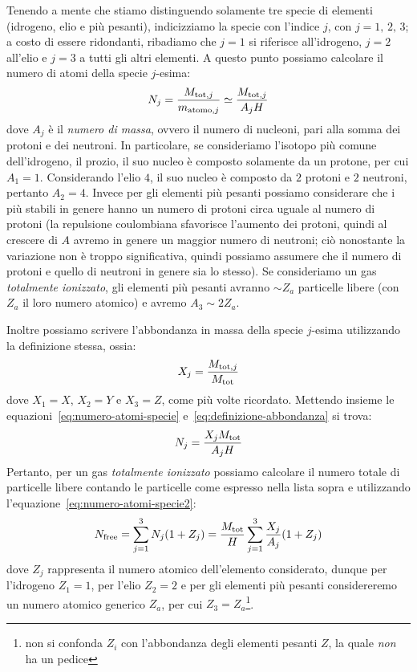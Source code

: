 Tenendo a mente che stiamo distinguendo solamente tre specie di elementi (idrogeno, elio e più pesanti), indicizziamo la specie con l'indice $j$, con $j = 1, \, 2, \, 3$; a costo di essere ridondanti, ribadiamo che $j=1$ si riferisce all'idrogeno, $j=2$ all'elio e $j=3$ a tutti gli altri elementi. A questo punto possiamo calcolare il numero di atomi della specie $j$-esima:
\begin{equation}\label{eq:numero-atomi-specie}
    N_j = \frac{M_{\textup{tot}, j}}{m_{\textup{atomo}, j}} \simeq \frac{M_{\textup{tot}, j}}{A_j H}
\end{equation}
dove $A_j$ è il \emph{numero di massa}, ovvero il numero di nucleoni, pari alla somma dei protoni e dei neutroni. In particolare, se consideriamo l'isotopo più comune dell'idrogeno, il prozio, il suo nucleo è composto solamente da un protone, per cui $A_1 = 1$. Considerando l'elio $4$, il suo nucleo è composto da $2$ protoni e $2$ neutroni, pertanto $A_2 = 4$. Invece per gli elementi più pesanti possiamo considerare che i più stabili in genere hanno un numero di protoni circa uguale al numero di protoni (la repulsione coulombiana sfavorisce l'aumento dei protoni, quindi al crescere di $A$ avremo in genere un maggior numero di neutroni; ciò nonostante la variazione non è troppo significativa, quindi possiamo assumere che il numero di protoni e quello di neutroni in genere sia lo stesso). Se consideriamo un gas \emph{totalmente ionizzato}, gli elementi più pesanti avranno $\sim Z_a$ particelle libere (con $Z_a$ il loro numero atomico) e avremo $A_3 \sim 2 Z_a$.

Inoltre possiamo scrivere l'abbondanza in massa della specie $j$-esima utilizzando la definizione stessa, ossia: 
\begin{equation}\label{eq:definizione-abbondanza}
    X_j = \frac{M_{\textup{tot}, j}}{M_\textup{tot}}
\end{equation}
dove $X_1 = X$, $X_2 = Y$ e $X_3 = Z$, come più volte ricordato. Mettendo insieme le equazioni~\eqref{eq:numero-atomi-specie} e~\eqref{eq:definizione-abbondanza} si trova:
\begin{equation}\label{eq:numero-atomi-specie2}
    N_j =\frac{X_j M_\textup{tot}}{A_j H}
\end{equation}
Pertanto, per un gas \emph{totalmente ionizzato} possiamo calcolare il numero totale di particelle libere contando le particelle come espresso nella lista sopra e utilizzando l'equazione~\eqref{eq:numero-atomi-specie2}:
\begin{equation}\label{eq:numero-atomi-liberi}
    N_\textup{free} = \sum_{j=1}^3 N_j (1 + Z_j) = \frac{M_\textup{tot}}{H} \sum_{j=1}^3 \frac{X_j}{A_j} (1+Z_j)
\end{equation}
dove $Z_j$ rappresenta il numero atomico dell'elemento considerato, dunque per l'idrogeno $Z_1 =1$, per l'elio $Z_2 = 2$ e per gli elementi più pesanti considereremo un numero atomico generico $Z_a$, per cui $Z_3 = Z_a$\footnote{non si confonda $Z_i$ con l'abbondanza degli elementi pesanti $Z$, la quale \emph{non} ha un pedice}. 

